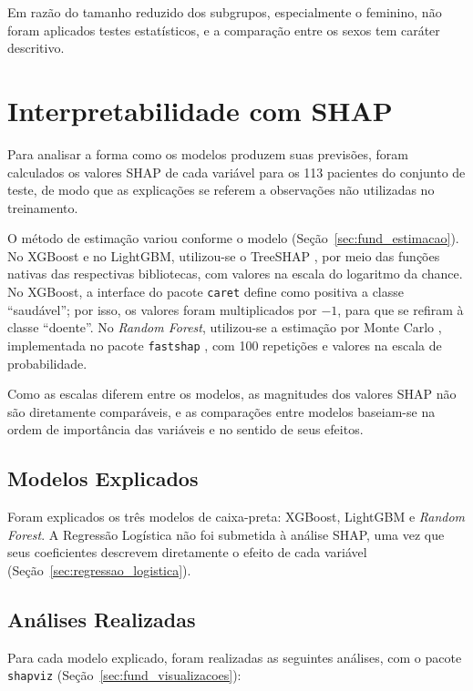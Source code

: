 Em razão do tamanho reduzido dos subgrupos, especialmente o feminino, não foram aplicados testes estatísticos, e a comparação entre os sexos tem caráter descritivo.

\section{Interpretabilidade com SHAP}
\label{sec:shap}\label{sec:estimacao_shap}

Para analisar a forma como os modelos produzem suas previsões, foram calculados os valores SHAP \cite{Lundberg2017Unified} de cada variável para os 113 pacientes do conjunto de teste, de modo que as explicações se referem a observações não utilizadas no treinamento.

O método de estimação variou conforme o modelo (Seção~\ref{sec:fund_estimacao}). No XGBoost e no LightGBM, utilizou-se o TreeSHAP \cite{Lundberg2020Trees}, por meio das funções nativas das respectivas bibliotecas, com valores na escala do logaritmo da chance. No XGBoost, a interface do pacote \texttt{caret} define como positiva a classe ``saudável''; por isso, os valores foram multiplicados por $-1$, para que se refiram à classe ``doente''. No \textit{Random Forest}, utilizou-se a estimação por Monte Carlo \cite{Strumbelj2014Explaining}, implementada no pacote \texttt{fastshap} \cite{Greenwell2024fastshap}, com 100 repetições e valores na escala de probabilidade.

Como as escalas diferem entre os modelos, as magnitudes dos valores SHAP não são diretamente comparáveis, e as comparações entre modelos baseiam-se na ordem de importância das variáveis e no sentido de seus efeitos.

\subsection{Modelos Explicados}
\label{sec:modelos_explicados}

Foram explicados os três modelos de caixa-preta: XGBoost, LightGBM e \textit{Random Forest}. A Regressão Logística não foi submetida à análise SHAP, uma vez que seus coeficientes descrevem diretamente o efeito de cada variável (Seção~\ref{sec:regressao_logistica}).

\subsection{Análises Realizadas}
\label{sec:analises_shap}

Para cada modelo explicado, foram realizadas as seguintes análises, com o pacote \texttt{shapviz} \cite{Mayer2026shapviz} (Seção~\ref{sec:fund_visualizacoes}):

